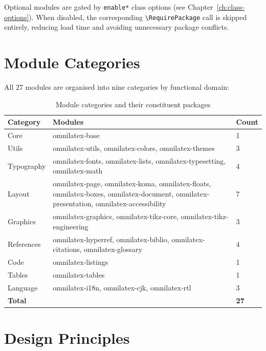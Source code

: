 Optional modules are gated by \texttt{enable*} class options (see
Chapter~\ref{ch:class-options}).  When disabled, the corresponding
\texttt{\textbackslash RequirePackage} call is skipped entirely, reducing
load time and avoiding unnecessary package conflicts.

\section{Module Categories}

All 27 modules are organised into nine categories by functional domain:

\begin{table}[htbp]
  \centering
  \begin{tabular}{@{} l l p{5cm} @{}}
    \toprule
    \textbf{Category} & \textbf{Modules} & \textbf{Count} \\
    \midrule
    Core &
      omnilatex-base &
      1 \\[3pt]
    Utils &
      omnilatex-utils, omnilatex-colors, omnilatex-themes &
      3 \\[3pt]
    Typography &
      omnilatex-fonts, omnilatex-lists, omnilatex-typesetting,
      omnilatex-math &
      4 \\[3pt]
    Layout &
      omnilatex-page, omnilatex-koma, omnilatex-floats,
      omnilatex-boxes, omnilatex-document, omnilatex-presentation,
      omnilatex-accessibility &
      7 \\[3pt]
    Graphics &
      omnilatex-graphics, omnilatex-tikz-core,
      omnilatex-tikz-engineering &
      3 \\[3pt]
    References &
      omnilatex-hyperref, omnilatex-biblio, omnilatex-citations,
      omnilatex-glossary &
      4 \\[3pt]
    Code &
      omnilatex-listings &
      1 \\[3pt]
    Tables &
      omnilatex-tables &
      1 \\[3pt]
    Language &
      omnilatex-i18n, omnilatex-cjk, omnilatex-rtl &
      3 \\
    \midrule
    \textbf{Total} & & \textbf{27} \\
    \bottomrule
  \end{tabular}
  \caption{Module categories and their constituent packages}
\end{table}

\section{Design Principles}

